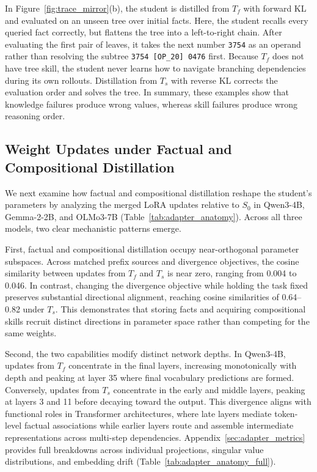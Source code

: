 \documentclass[]{template}
\theoremstyle{plain}
\theoremstyle{definition}
\theoremstyle{remark}
\begin{document}
In Figure~\ref{fig:trace_mirror}(b), the student is distilled from $T_f$ with forward KL and evaluated on an unseen tree over initial facts. Here, the student recalls every queried fact correctly, but flattens the tree into a left-to-right chain. After evaluating the first pair of leaves, it takes the next number \texttt{3754} as an operand rather than resolving the subtree \texttt{3754 [OP\_20] 0476} first. Because $T_f$ does not have tree skill, the student never learns how to navigate branching dependencies during its own rollouts. Distillation from $T_s$ with reverse KL corrects the evaluation order and solves the tree. In summary, these examples show that knowledge failures produce wrong values, whereas skill failures produce wrong reasoning order.


\subsection{Weight Updates under Factual and Compositional Distillation}
\label{sec:adapter_anatomy}

We next examine how factual and compositional distillation reshape the student's parameters by analyzing the merged LoRA updates relative to $S_0$ in Qwen3-4B, Gemma-2-2B, and OLMo3-7B (Table~\ref{tab:adapter_anatomy}). Across all three models, two clear mechanistic patterns emerge.

First, factual and compositional distillation occupy near-orthogonal parameter subspaces. Across matched prefix sources and divergence objectives, the cosine similarity between updates from $T_f$ and $T_s$ is near zero, ranging from 0.004 to 0.046. In contrast, changing the divergence objective while holding the task fixed preserves substantial directional alignment, reaching cosine similarities of 0.64--0.82 under $T_s$. This demonstrates that storing facts and acquiring compositional skills recruit distinct directions in parameter space rather than competing for the same weights. 

Second, the two capabilities modify distinct network depths. In Qwen3-4B, updates from $T_f$ concentrate in the final layers, increasing monotonically with depth and peaking at layer 35 where final vocabulary predictions are formed. Conversely, updates from $T_s$ concentrate in the early and middle layers, peaking at layers 3 and 11 before decaying toward the output. This divergence aligns with functional roles in Transformer architectures, where late layers mediate token-level factual associations while earlier layers route and assemble intermediate representations across multi-step dependencies. Appendix~\ref{sec:adapter_metrics} provides full breakdowns across individual projections, singular value distributions, and embedding drift (Table~\ref{tab:adapter_anatomy_full}).
\end{document}
